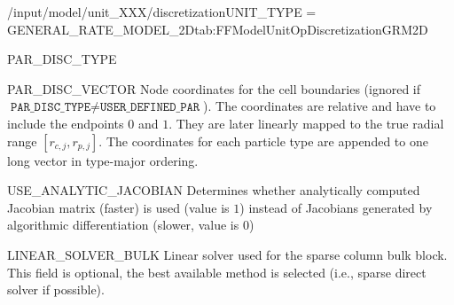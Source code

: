 \begin{condsubgroup}{/input/model/unit\_XXX/discretization}{UNIT\_TYPE = GENERAL\_RATE\_MODEL\_2D}{tab:FFModelUnitOpDiscretizationGRM2D}
\begin{dataset}[type=string,length={$1$ / \texttt{NPARTYPE}}]{PAR\_DISC\_TYPE}
  \end{dataset}
  \begin{dataset}[unit=--,type=double,range={$[0,1]$},length={$\sum_i (\texttt{NPAR}_i + 1)$}]{PAR\_DISC\_VECTOR}
    Node coordinates for the cell boundaries (ignored if $\texttt{PAR\_DISC\_TYPE} \neq \texttt{USER\_DEFINED\_PAR}$).
    The coordinates are relative and have to include the endpoints $0$ and $1$.
    They are later linearly mapped to the true radial range $[r_{c,j}, r_{p,j}]$.
    The coordinates for each particle type are appended to one long vector in type-major ordering.
  \end{dataset}
  \begin{dataset}[type=int,range={$\{0, 1\}$},length=1]{USE\_ANALYTIC\_JACOBIAN}
    Determines whether analytically computed Jacobian matrix (faster) is used (value is $1$) instead of Jacobians generated by algorithmic differentiation (slower, value is $0$)
  \end{dataset}
  \begin{dataset}[type=string,range={$\{\texttt{DENSE},\texttt{UMFPACK},\texttt{SUPERLU}\}$},length={1}]{LINEAR\_SOLVER\_BULK}
    Linear solver used for the sparse column bulk block.
    This field is optional, the best available method is selected (i.e., sparse direct solver if possible).


\end{dataset}
\end{condsubgroup}
